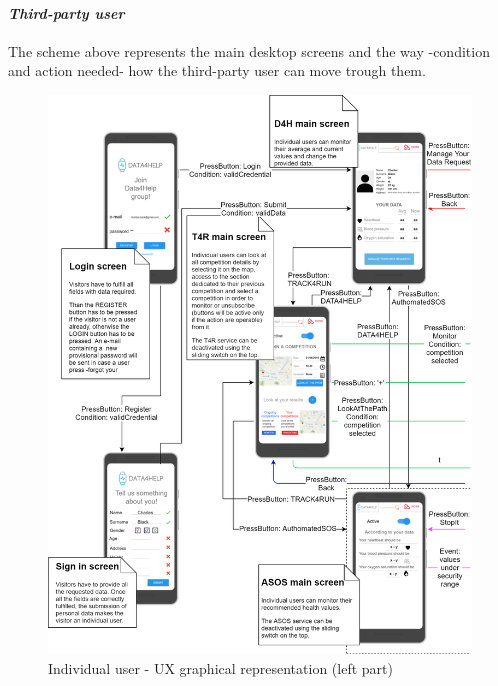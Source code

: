 \paragraph{\textit{Third-party user}} The scheme above represents the main desktop screens and the way -condition and action needed- how the third-party user can move trough them.
\begin{figure}[H]
\caption{Individual user - UX graphical representation (left part)}
\includegraphics[width = \textwidth]{sections/userInterfacesGraphs/UserExperienceScreenSX.png}
\end{figure}
